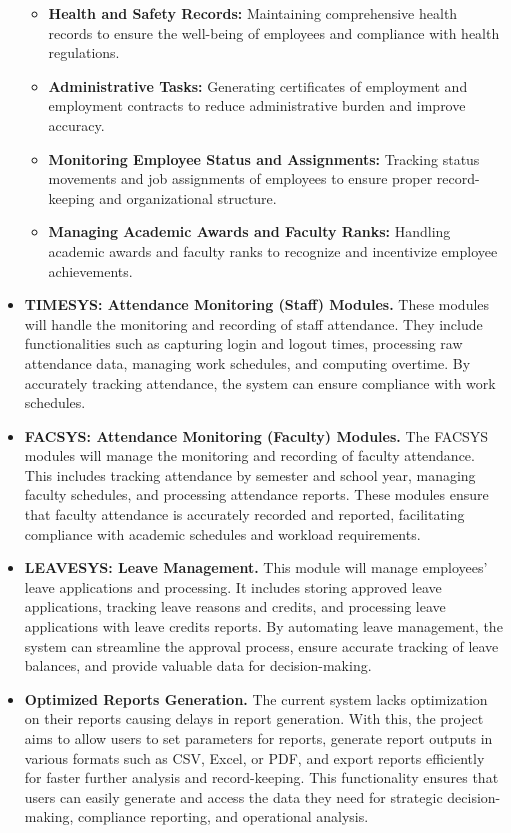 \begin{itemize}
\begin{itemize}
            \item[] \textbf{Health and Safety Records: } Maintaining comprehensive health records to ensure the well-being of employees and compliance with health regulations.
            
            \item[] \textbf{Administrative Tasks: } Generating certificates of employment and employment contracts to reduce administrative burden and improve accuracy.
            
            \item[] \textbf{Monitoring Employee Status and Assignments:  } Tracking status movements and job assignments of employees to ensure proper record-keeping and organizational structure.
            
            \item[] \textbf{Managing Academic Awards and Faculty Ranks: } Handling academic awards and faculty ranks to recognize and incentivize employee achievements.
        \end{itemize}
       

        \item[] \textbf{TIMESYS: Attendance Monitoring (Staff) Modules.} These modules will handle the monitoring and recording of staff attendance. They include functionalities such as capturing login and logout times, processing raw attendance data, managing work schedules, and computing overtime. By accurately tracking attendance, the system can ensure compliance with work schedules.
        \item[] \textbf{FACSYS: Attendance Monitoring (Faculty) Modules.} The FACSYS modules will manage the monitoring and recording of faculty attendance. This includes tracking attendance by semester and school year, managing faculty schedules, and processing attendance reports. These modules ensure that faculty attendance is accurately recorded and reported, facilitating compliance with academic schedules and workload requirements.
        \item[] \textbf{LEAVESYS: Leave Management.} This module will manage employees' leave applications and processing. It includes storing approved leave applications, tracking leave reasons and credits, and processing leave applications with leave credits reports. By automating leave management, the system can streamline the approval process, ensure accurate tracking of leave balances, and provide valuable data for decision-making.
        \item[] \textbf{Optimized Reports Generation.} The current system lacks optimization on their reports causing delays in report generation. With this, the project aims to allow users to set parameters for reports, generate report outputs in various formats such as CSV, Excel, or PDF, and export reports efficiently for faster further analysis and record-keeping. This functionality ensures that users can easily generate and access the data they need for strategic decision-making, compliance reporting, and operational analysis.
    \end{itemize}

